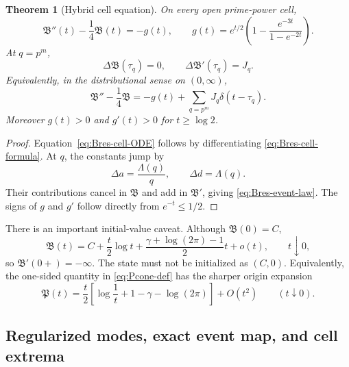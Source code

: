 \documentclass[11pt,a4paper]{article}
\numberwithin{equation}{section}
\newtheorem{theorem}{Theorem}
\theoremstyle{definition}
\newcommand{\Bres}{\mathfrak B}
\begin{document}
\begin{theorem}[Hybrid cell equation]
\label{thm:Bres-cell-dynamics}
On every open prime-power cell,
\begin{equation}\label{eq:Bres-cell-ODE}
  \boxed{
  \Bres''(t)-\frac14\Bres(t)=-g(t),
  \qquad
  g(t)=e^{t/2}\left(1-\frac{e^{-3t}}{1-e^{-2t}}\right).
  }
\end{equation}
At \(q=p^m\),
\begin{equation}\label{eq:Bres-event-law}
  \boxed{
  \Delta\Bres(\tau_q)=0,
  \qquad
  \Delta\Bres'(\tau_q)=J_q.
  }
\end{equation}
Equivalently, in the distributional sense on \((0,\infty)\),
\begin{equation}\label{eq:Bres-distributional-ODE}
  \Bres''-\frac14\Bres
  =-g(t)+\sum_{q=p^m}J_q\delta(t-\tau_q).
\end{equation}
Moreover \(g(t)>0\) and \(g'(t)>0\) for \(t\ge\log2\).
\end{theorem}

\begin{proof}
Equation~\eqref{eq:Bres-cell-ODE} follows by differentiating
\eqref{eq:Bres-cell-formula}.  At \(q\), the constants jump by
\[
  \Delta a=\frac{\Lambda(q)}q,
  \qquad
  \Delta d=\Lambda(q).
\]
Their contributions cancel in \(\Bres\) and add in \(\Bres'\), giving
\eqref{eq:Bres-event-law}.  The signs of \(g\) and \(g'\) follow directly
from \(e^{-t}\le1/2\).
\end{proof}

There is an important initial-value caveat.  Although \(\Bres(0)=C\),
\begin{equation}\label{eq:Bres-origin-expansion}
  \Bres(t)=C+\frac t2\log t
  +\frac{\gamma+\log(2\pi)-1}{2}t+o(t),
  \qquad t\downarrow0,
\end{equation}
so \(\Bres'(0+)=-\infty\).  The state must not be initialized as \((C,0)\).
Equivalently, the one-sided quantity in \eqref{eq:Pcone-def} has the sharper
origin expansion
\begin{equation}\label{eq:Pcone-origin-expansion}
  \boxed{
  \mathfrak P(t)=\frac t2\left[
    \log\frac1t+1-\gamma-\log(2\pi)
  \right]+O(t^2)
  }
  \qquad(t\downarrow0).
\end{equation}

\subsection{Regularized modes, exact event map, and cell extrema}
\end{document}
